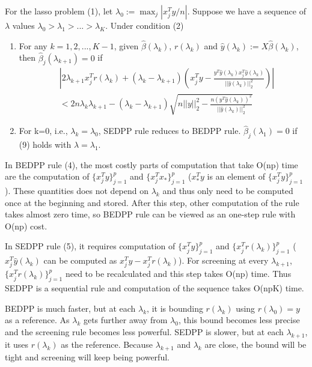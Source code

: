 \begin{theorem}[SEDPP]
    For the lasso problem (1), let $\lambda_0:=\max_j|x_j^Ty/n|$. Suppose we have a sequence of $\lambda$ values $\lambda_0>\lambda_1>...>\lambda_K$. Under condition (2)
    \begin{enumerate}
        \item For any $k=1,2,...,K-1$, given $\hat{\beta}(\lambda_k)$, $r(\lambda_k)$ and $\hat{y}(\lambda_k):=X\hat{\beta}(\lambda_k)$, then $\hat{\beta}_j(\lambda_{k+1})=0$ if
        \begin{equation}
            \begin{split}
                &\left|2\lambda_{k+1}x_j^Tr(\lambda_k)+(\lambda_k-\lambda_{k+1})\left( x_j^Ty-\frac{y^T\hat{y}(\lambda_k)x_j^T\hat{y}(\lambda_k)}{||\hat{y}(\lambda_k)||_2^2}\right)\right|\\&<2n\lambda_k\lambda_{k+1}-(\lambda_k-\lambda_{k+1})\sqrt{n||y||_2^2-\frac{n(y^T\hat{y}(\lambda_k))^2}{||\hat{y}(\lambda_k)||_2^2}}
            \end{split}
        \end{equation}
        \item For k=0, i.e., $\lambda_k=\lambda_0$, SEDPP rule reduces to BEDPP rule. $\hat{\beta}_j(\lambda_1)=0$ if (9) holds with $\lambda=\lambda_1$.
    \end{enumerate}
\end{theorem}

In BEDPP rule (4), the most costly parts of computation that take O(np) time are the computation of $\{x_j^Ty\}_{j=1}^p$ and $\{x_j^Tx_*\}_{j=1}^p$ ($x_*^Ty$ is an element of $\{x_j^Ty\}_{j=1}^p$). These quantities does not depend on $\lambda_k$ and thus only need to be computed once at the beginning and stored. After this step, other computation of the rule takes almost zero time, so BEDPP rule can be viewed as an one-step rule with O(np) cost.

In SEDPP rule (5), it requires computation of $\{x_j^Ty\}_{j=1}^p$ and $\{x_j^Tr(\lambda_k)\}_{j=1}^p$ ($x_j^T\hat{y}(\lambda_k)$ can be computed as $x_j^Ty-x_j^Tr(\lambda_k)$). For screening at every $\lambda_{k+1}$, $\{x_j^Tr(\lambda_k)\}_{j=1}^p$ need to be recalculated and this step takes O(np) time. Thus SEDPP is a sequential rule and computation of the sequence takes O(npK) time.

BEDPP is much faster, but at each $\lambda_k$, it is bounding $r(\lambda_k)$ using $r(\lambda_0)=y$ as a reference. As $\lambda_k$ gets further away from $\lambda_0$, this bound becomes less precise and the screening rule becomes less powerful. SEDPP is slower, but at each $\lambda_{k+1}$, it uses $r(\lambda_{k})$ as the reference. Because $\lambda_{k+1}$ and $\lambda_k$ are close, the bound will be tight and screening will keep being powerful.

